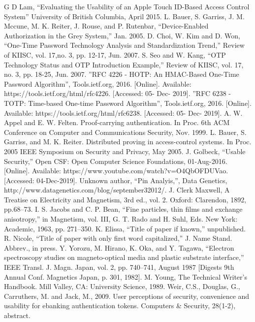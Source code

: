 \documentclass[conference]{IEEEtran}
\begin{document}

\begin{thebibliography}{00}
 G D Lam, “Evaluating the Usability of an Apple Touch ID-Based Access Control System” University of British Columbia, April 2015.
 L. Bauer, S. Garriss, J. M. Mccune, M. K. Reiter, J. Rouse, and P. Rutenbar, “Device-Enabled Authorization in the Grey System,” Jan. 2005.
 D. Choi, W. Kim and D. Won, “One-Time Password Technology Analysis and Standardization Trend,” Review of KIISC, vol. 17,no. 3, pp. 12-17, Jun. 2007.
 S. Seo and W. Kang, “OTP Technology Status and OTP Introduction Example,” Review of KIISC, vol. 17, no. 3, pp. 18-25, Jun. 2007.
 ”RFC 4226 - HOTP: An HMAC-Based One-Time Password Algorithm”, Tools.ietf.org, 2016. [Online]. Available: https://tools.ietf.org/html/rfc4226. [Accessed: 05- Dec- 2019].
 ”RFC 6238 - TOTP: Time-based One-time Password Algorithm”, Tools.ietf.org, 2016. [Online]. Available: https://tools.ietf.org/html/rfc6238. [Accessed: 05- Dec- 2019].
 A. W. Appel and E. W. Felten. Proof-carrying authentication. In Proc. 6th ACM Conference on Computer and Communications Security, Nov. 1999.
 L. Bauer, S. Garriss, and M. K. Reiter. Distributed proving in access-control systems. In Proc. 2005 IEEE Symposium on Security and Privacy, May 2005.
J. Golbeck, “Usable Security,” Open CSF: Open Computer Science Foundations, 01-Aug-2016. [Online]. Available: https://www.youtube.com/watch?v=O4QbOFDUVao. [Accessed: 04-Dec-2019].
 Unknown author, ``Pin Analyis,'', Data Genetics, http://www.datagenetics.com/blog/september32012/.
 J. Clerk Maxwell, A Treatise on Electricity and Magnetism, 3rd ed., vol. 2. Oxford: Clarendon, 1892, pp.68--73.
 I. S. Jacobs and C. P. Bean, ``Fine particles, thin films and exchange anisotropy,'' in Magnetism, vol. III, G. T. Rado and H. Suhl, Eds. New York: Academic, 1963, pp. 271--350.
 K. Elissa, ``Title of paper if known,'' unpublished.
 R. Nicole, ``Title of paper with only first word capitalized,'' J. Name Stand. Abbrev., in press.
 Y. Yorozu, M. Hirano, K. Oka, and Y. Tagawa, ``Electron spectroscopy studies on magneto-optical media and plastic substrate interface,'' IEEE Transl. J. Magn. Japan, vol. 2, pp. 740--741, August 1987 [Digests 9th Annual Conf. Magnetics Japan, p. 301, 1982].
 M. Young, The Technical Writer's Handbook. Mill Valley, CA: University Science, 1989.
 Weir, C.S., Douglas, G., Carruthers, M. and Jack, M., 2009. User perceptions of security, convenience and usability for ebanking authentication tokens. Computers \& Security, 28(1-2), abstract.
\end{thebibliography}
\end{document}

